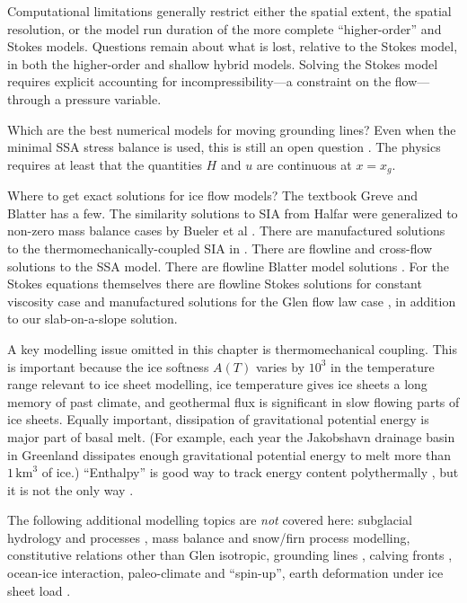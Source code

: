 \documentclass[titlepage,letterpaper,final,12pt]{scrartcl}
\begin{document}
Computational limitations generally restrict either the spatial extent, the spatial resolution, or the model run duration of the more complete ``higher-order'' and Stokes models.  Questions remain about what is lost, relative to the Stokes model, in both the higher-order \cite{ISMIPHOM} and shallow hybrid models.  Solving the Stokes model requires explicit accounting for incompressibility---a constraint on the flow---through a pressure variable.

Which are the best numerical models for moving grounding lines?  Even when the minimal SSA stress balance is used, this is still an open question \cite{SchoofMarine1,MISMIP2012}.  The physics requires at least that the quantities $H$ and $u$ are continuous at $x=x_g$.

Where to get exact solutions for ice flow models?  The textbook Greve and Blatter \cite{GreveBlatter2009} has a few.  The similarity solutions to SIA from Halfar \cite{Halfar81,Halfar83} were generalized to non-zero mass balance cases by Bueler et al \cite{BLKCB}.  There are manufactured solutions to the thermomechanically-coupled SIA in  \cite{BBL}.  There are flowline \cite{vanderVeen83} and cross-flow \cite{SchoofStream} solutions to the SSA model.  There are flowline Blatter model solutions \cite{GlowinskiRappaz}.  For the Stokes equations themselves there are flowline Stokes solutions for constant viscosity case \cite{BaliseRaymond1985} and manufactured solutions for the Glen flow law case \cite{JouvetRappaz2011,SargentFastook2010}, in addition to our slab-on-a-slope solution.

A key modelling issue omitted in this chapter is thermomechanical coupling.  This is important because the ice softness $A(T)$ varies by $10^3$ in the temperature range relevant to ice sheet modelling, ice temperature gives ice sheets a long memory of past climate, and geothermal flux is significant in slow flowing parts of ice sheets.  Equally important, dissipation of gravitational potential energy is major part of basal melt.  (For example, each year the Jakobshavn drainage basin in Greenland dissipates enough gravitational potential energy to melt more than $1\,\text{km}^3$ of ice.)  ``Enthalpy'' is good way to track energy content polythermally \cite{AschwandenBuelerKhroulevBlatter}, but it is not the only way \cite{Greve}.

The following additional modelling topics are \emph{not} covered here: subglacial hydrology and processes \cite{Clarke05}, mass balance and snow/firn process modelling, constitutive relations other than Glen isotropic, grounding lines \cite{SchoofMarine1}, calving fronts \cite{Albrechtetal2011}, ocean-ice interaction, paleo-climate and ``spin-up'', earth deformation under ice sheet load \cite{Peltier1998review}.
\end{document}
